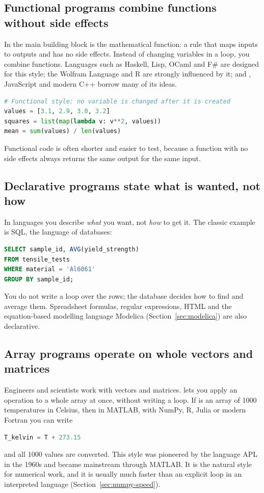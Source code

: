 \subsection*{Functional programs combine functions without side effects}

In  the main building block is the mathematical function:
a rule that maps inputs to outputs and has no side effects. Instead of changing variables
in a loop, you combine functions. Languages such as Haskell, Lisp, OCaml and F\# are
designed for this style; the Wolfram Language and R are strongly influenced by it; and
\py, JavaScript and modern C++ borrow many of its ideas.
\begin{lstlisting}[language=Python]
# Functional style: no variable is changed after it is created
values = [3.1, 2.9, 3.0, 3.2]
squares = list(map(lambda v: v**2, values))
mean = sum(values) / len(values)
\end{lstlisting}
Functional code is often shorter and easier to test, because a function with no side
effects always returns the same output for the same input.

\subsection*{Declarative programs state what is wanted, not how}

In  languages you describe \emph{what} you want, not \emph{how} to get
it. The classic example is SQL, the language of databases:
\begin{lstlisting}[language=SQL]
SELECT sample_id, AVG(yield_strength)
FROM tensile_tests
WHERE material = 'Al6061'
GROUP BY sample_id;
\end{lstlisting}
You do not write a loop over the rows; the database decides how to find and average
them. Spreadsheet formulas, regular expressions, HTML and the equation-based modelling
language Modelica (Section~\ref{sec:modelica}) are also declarative.

\subsection*{Array programs operate on whole vectors and matrices}

Engineers and scientists work with vectors and matrices.  lets
you apply an operation to a whole array at once, without writing a loop. If  is an
array of 1000 temperatures in Celsius, then in MATLAB, \py with NumPy, R, Julia or modern
Fortran you can write
\begin{lstlisting}[language=Python]
T_kelvin = T + 273.15
\end{lstlisting}
and all 1000 values are converted. This style was pioneered by the language APL in the
1960s and became mainstream through MATLAB. It is the natural style for numerical work,
and it is usually much faster than an explicit loop in an interpreted language
(Section~\ref{sec:numpy-speed}).

